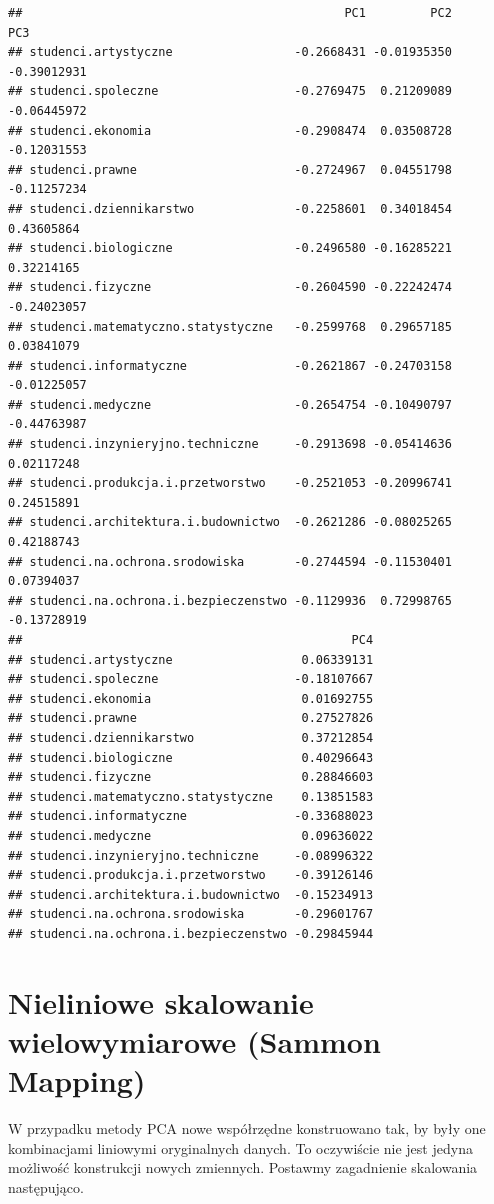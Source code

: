 \documentclass[polish,]{book}
\begin{document}
\begin{verbatim}
##                                             PC1         PC2         PC3
## studenci.artystyczne                 -0.2668431 -0.01935350 -0.39012931
## studenci.spoleczne                   -0.2769475  0.21209089 -0.06445972
## studenci.ekonomia                    -0.2908474  0.03508728 -0.12031553
## studenci.prawne                      -0.2724967  0.04551798 -0.11257234
## studenci.dziennikarstwo              -0.2258601  0.34018454  0.43605864
## studenci.biologiczne                 -0.2496580 -0.16285221  0.32214165
## studenci.fizyczne                    -0.2604590 -0.22242474 -0.24023057
## studenci.matematyczno.statystyczne   -0.2599768  0.29657185  0.03841079
## studenci.informatyczne               -0.2621867 -0.24703158 -0.01225057
## studenci.medyczne                    -0.2654754 -0.10490797 -0.44763987
## studenci.inzynieryjno.techniczne     -0.2913698 -0.05414636  0.02117248
## studenci.produkcja.i.przetworstwo    -0.2521053 -0.20996741  0.24515891
## studenci.architektura.i.budownictwo  -0.2621286 -0.08025265  0.42188743
## studenci.na.ochrona.srodowiska       -0.2744594 -0.11530401  0.07394037
## studenci.na.ochrona.i.bezpieczenstwo -0.1129936  0.72998765 -0.13728919
##                                              PC4
## studenci.artystyczne                  0.06339131
## studenci.spoleczne                   -0.18107667
## studenci.ekonomia                     0.01692755
## studenci.prawne                       0.27527826
## studenci.dziennikarstwo               0.37212854
## studenci.biologiczne                  0.40296643
## studenci.fizyczne                     0.28846603
## studenci.matematyczno.statystyczne    0.13851583
## studenci.informatyczne               -0.33688023
## studenci.medyczne                     0.09636022
## studenci.inzynieryjno.techniczne     -0.08996322
## studenci.produkcja.i.przetworstwo    -0.39126146
## studenci.architektura.i.budownictwo  -0.15234913
## studenci.na.ochrona.srodowiska       -0.29601767
## studenci.na.ochrona.i.bezpieczenstwo -0.29845944
\end{verbatim}

\hypertarget{part_22}{%
\section{Nieliniowe skalowanie wielowymiarowe (Sammon Mapping)}\label{part_22}}

W przypadku metody PCA nowe współrzędne konstruowano tak, by były one kombinacjami liniowymi oryginalnych danych. To oczywiście nie jest jedyna możliwość konstrukcji nowych zmiennych. Postawmy zagadnienie skalowania następująco.
\end{document}
